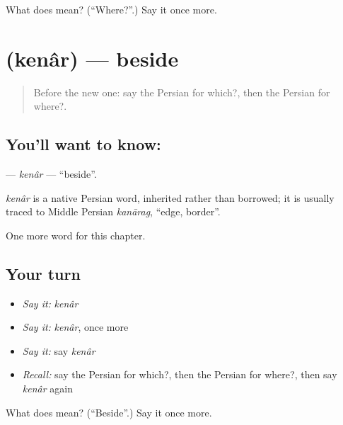 \begin{tcolorbox}[breakable,colback=teal!4,colframe=teal!35!black,title={Before you move on}]
What does  mean? (\textquotedblleft{}Where?\textquotedblright{}.) Say it once more.
\end{tcolorbox}
\section[\texorpdfstring{\fa{کنار} (kenâr)}{کنار (kenâr)}]{ (kenâr) — beside}

\label{lesson:FA-C85-kenar}



\begin{quote}
Before the new one: say the Persian for which?, then the Persian for where?.
\end{quote}

\subsection*{You'll want to know: }
\textbf{} — \emph{kenâr} — \textquotedblleft{}beside\textquotedblright{}.

\begin{cousinweb}
\emph{kenâr} is a native Persian word, inherited rather than borrowed; it is usually traced to Middle Persian \emph{kanārag}, \textquotedblleft{}edge, border\textquotedblright{}.
\end{cousinweb}

\begin{grammarlens}[title={What you've built}]
One more word for this chapter.
\end{grammarlens}

\subsection*{Your turn}
\begin{itemize}
\raggedright
  \item \emph{Say it:} \emph{kenâr}
  \item \emph{Say it:} \emph{kenâr}, once more
  \item \emph{Say it:} say \emph{kenâr}
  \item \emph{Recall:} say the Persian for which?, then the Persian for where?, then say \emph{kenâr} again
\end{itemize}

\begin{tcolorbox}[breakable,colback=teal!4,colframe=teal!35!black,title={Before you move on}]
What does  mean? (\textquotedblleft{}Beside\textquotedblright{}.) Say it once more.
\end{tcolorbox}
